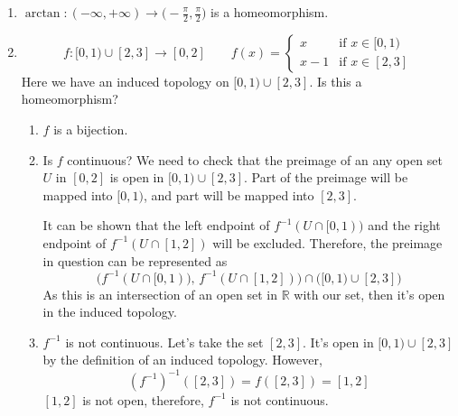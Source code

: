 \begin{example}
    \begin{enumerate}
        \item {
            $
                \arctan: (-\infty, +\infty) \to
                \bigl(-\frac{\pi}{2}, \frac{\pi}{2}\bigr)
            $ is a homeomorphism.
        }
        \item {
            \[
                f: [0, 1) \cup [2, 3] \to [0, 2] \qquad
                f(x) = \begin{cases}
                    x & \text{if } x \in [0, 1)\\
                    x - 1 & \text{if } x \in [2, 3]
                \end{cases}
            \]
            Here we have an induced topology on $[0, 1) \cup [2, 3]$. Is this a homeomorphism?
            \begin{enumerate}
                \item {
                    $f$ is a bijection.
                }
                \item {
                    Is $f$ continuous? We need to check that the preimage of an any open 
                    set $U$ in $[0, 2]$ is open in $[0, 1) \cup [2, 3]$.
                    Part of the preimage will be mapped into $[0, 1)$, and part
                    will be mapped into $[2, 3]$.
                    
                    It can be shown that the left endpoint of $f^{-1}(U \cap [0, 1))$
                    and the right endpoint of $f^{-1}(U \cap [1, 2])$ will be excluded.
                    Therefore, the preimage in question can be represented as
                    \[
                        \bigl(f^{-1}(U \cap [0, 1)),\, f^{-1}(U \cap [1, 2])\bigr)
                        \cap \bigl([0, 1) \cup [2, 3]\bigr)
                    \]
                    As this is an intersection of an open set in $\mathbb{R}$ with
                    our set, then it's open in the induced topology.
                }
                \item {
                    $f^{-1}$ is not continuous.
                    Let's take the set $[2, 3]$. It's open in $[0, 1) \cup [2, 3]$
                    by the definition of an induced topology. However,
                    \[
                        (f^{-1})^{-1}([2, 3]) = f([2, 3]) = [1, 2]
                    \]
                    $[1, 2]$ is not open, therefore, $f^{-1}$ is not continuous.
                }
            \end{enumerate}
        }
    \end{enumerate}
\end{example}

